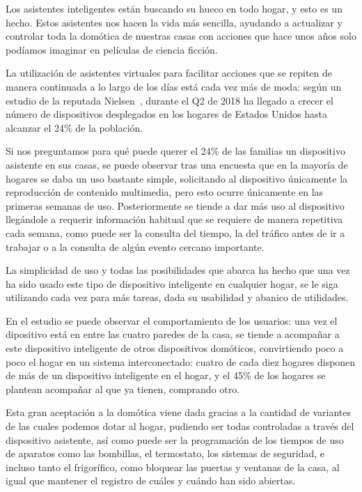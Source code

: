 Los asistentes inteligentes están buscando su hueco en todo hogar, y esto es un hecho.
Estos asistentes nos hacen la vida más sencilla, ayudando a actualizar y controlar toda la domótica de nuestras casas con acciones que hace unos años solo podíamos imaginar en películas de ciencia ficción.

La utilización de asistentes virtuales para facilitar acciones que se repiten de manera continuada a lo largo de los días está cada vez más de moda: según un estudio de la reputada Nielsen~\cite{nielsen}, durante el Q2 de 2018 ha llegado a crecer el número de dispositivos desplegados en los hogares de Estados Unidos hasta alcanzar el 24\% de la población.

Si nos preguntamos para qué puede querer el 24\% de las familias un dispositivo asistente en sus casas, se puede observar tras una encuesta que en la mayoría de hogares se daba un uso bastante simple, solicitando al dispositivo únicamente la reproducción de contenido multimedia, pero esto ocurre únicamente en las primeras semanas de uso. Posteriormente se tiende a dar más uso al dispositivo llegándole a requerir información habitual que se requiere de manera repetitiva cada semana, como puede ser la consulta del tiempo, la del tráfico antes de ir a trabajar o a la consulta de algún evento cercano importante.

La simplicidad de uso y todas las posibilidades que abarca ha hecho que una vez ha sido usado este tipo de dispositivo inteligente en cualquier hogar, se le siga utilizando cada vez para más tareas, dada su usabilidad y abanico de utilidades.

En el estudio se puede observar el comportamiento de los usuarios: una vez el dipositivo está en entre las cuatro paredes de la casa, se tiende a acompañar a este dispositivo inteligente de otros dispositivos domóticos, convirtiendo poco a poco el hogar en un sistema interconectado: cuatro de cada diez hogares disponen de más de un dispositivo inteligente en el hogar, y el 45\% de los hogares se plantean acompañar al que ya tienen, comprando otro.

Esta gran aceptación a la domótica viene dada gracias a la cantidad de variantes de las cuales podemos dotar al hogar, pudiendo ser todas controladas a través del dispositivo asistente, así como puede ser la programación de los tiempos de uso de aparatos como las bombillas, el termostato, los sistemas de seguridad, e incluso tanto el frigorífico, como bloquear las puertas y ventanas de la casa, al igual que mantener el registro de cuáles y cuándo han sido abiertas.

